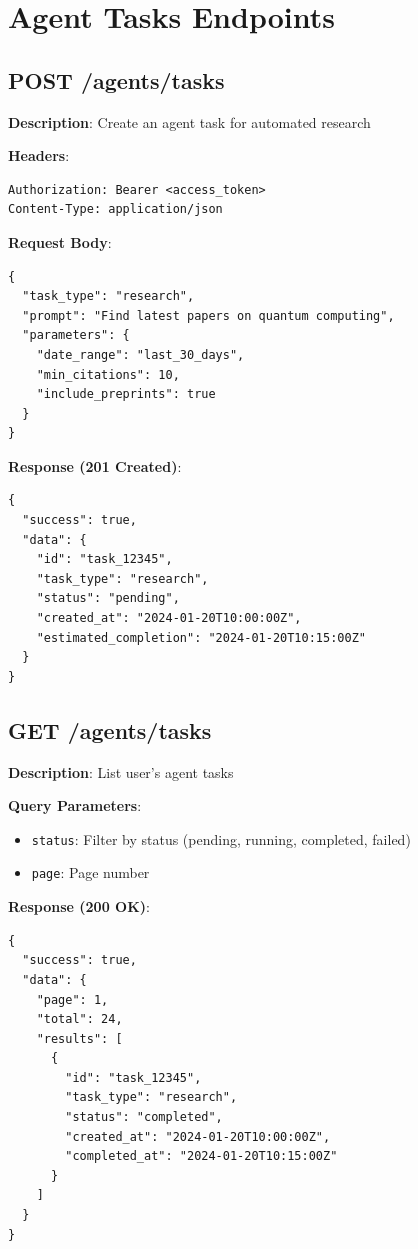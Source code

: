 \documentclass[12pt,a4paper]{report}
\begin{document}
\chapter{Agent Tasks Endpoints}

\section{POST /agents/tasks}

\textbf{Description}: Create an agent task for automated research

\textbf{Headers}:
\begin{lstlisting}
Authorization: Bearer <access_token>
Content-Type: application/json
\end{lstlisting}

\textbf{Request Body}:
\begin{lstlisting}
{
  "task_type": "research",
  "prompt": "Find latest papers on quantum computing",
  "parameters": {
    "date_range": "last_30_days",
    "min_citations": 10,
    "include_preprints": true
  }
}
\end{lstlisting}

\textbf{Response (201 Created)}:
\begin{lstlisting}
{
  "success": true,
  "data": {
    "id": "task_12345",
    "task_type": "research",
    "status": "pending",
    "created_at": "2024-01-20T10:00:00Z",
    "estimated_completion": "2024-01-20T10:15:00Z"
  }
}
\end{lstlisting}

\section{GET /agents/tasks}

\textbf{Description}: List user's agent tasks

\textbf{Query Parameters}:
\begin{itemize}
    \item \texttt{status}: Filter by status (pending, running, completed, failed)
    \item \texttt{page}: Page number
\end{itemize}

\textbf{Response (200 OK)}:
\begin{lstlisting}
{
  "success": true,
  "data": {
    "page": 1,
    "total": 24,
    "results": [
      {
        "id": "task_12345",
        "task_type": "research",
        "status": "completed",
        "created_at": "2024-01-20T10:00:00Z",
        "completed_at": "2024-01-20T10:15:00Z"
      }
    ]
  }
}
\end{lstlisting}
\end{document}
